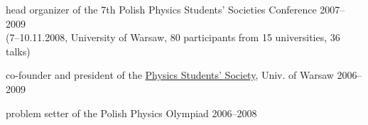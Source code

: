 \documentclass[margin,line]{resume}
\begin{document}
\begin{resume}
\begin{list2}
        \item head organizer of the 7th Polish Physics Students' Societies Conference \hfill 2007--2009\\
        (7--10.11.2008, University of Warsaw, 80 participants from 15 universities, 36 talks)
        \item co-founder and president of the \href{http://skfiz.fuw.edu.pl/en}{Physics Students' Society}, Univ. of Warsaw \hfill 2006--2009
        \item problem setter of the Polish Physics Olympiad \hfill 2006--2008
        \end{list2} 
	

\end{resume}
\end{document}
